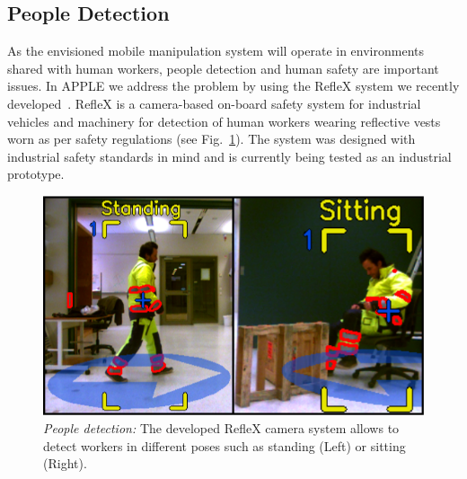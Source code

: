 \subsection{People Detection}
\label{subsec:people_det}
%
As the envisioned mobile manipulation system will operate in environments shared with human workers,
people detection and human safety are important issues. In APPLE we address the problem by using the
RefleX system we recently developed~\cite{Mosb14}. RefleX is a camera-based on-board safety system
for industrial vehicles and machinery for detection of human workers wearing reflective vests worn
as per safety regulations (see Fig.~\ref{fig:people_det}). The system was designed with industrial
safety standards in mind and is currently being tested as an industrial prototype.
%
\begin{figure}[t!]
  \begin{center}
    \includegraphics[width =1\linewidth]{figs/person_detection}
    \caption{\textit{People detection:} The developed RefleX camera system allows to detect workers
      in different poses such as standing (Left) or sitting (Right).}
    \label{fig:people_det}
    \vspace{-0.5cm}
  \end{center}
\end{figure}
